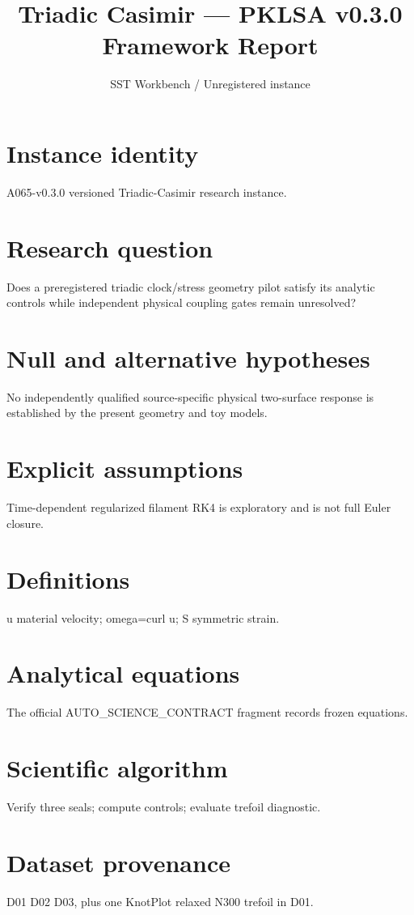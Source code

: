 \documentclass[10pt,a4paper]{article}
\title{Triadic Casimir --- PKLSA v0.3.0 Framework Report}
\author{SST Workbench / Unregistered instance}
\begin{document}
\maketitle
\section{Instance identity}
A065-v0.3.0 versioned Triadic-Casimir research instance.
\section{Research question}
Does a preregistered triadic clock/stress geometry pilot satisfy its analytic controls while independent physical coupling gates remain unresolved?
\section{Null and alternative hypotheses}
No independently qualified source-specific physical two-surface response is established by the present geometry and toy models.
\section{Explicit assumptions}
Time-dependent regularized filament RK4 is exploratory and is not full Euler closure.
\section{Definitions}
u material velocity; omega=curl u; S symmetric strain.
\section{Analytical equations}
The official AUTO\_SCIENCE\_CONTRACT fragment records frozen equations.

\section{Scientific algorithm}
Verify three seals; compute controls; evaluate trefoil diagnostic.
\section{Dataset provenance}
D01 D02 D03, plus one KnotPlot relaxed N300 trefoil in D01.
\end{document}
